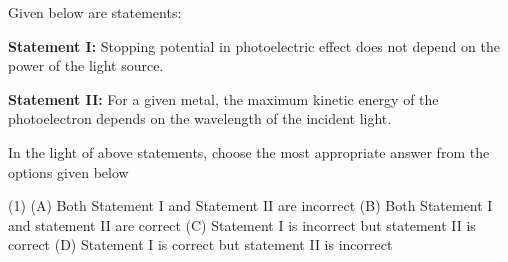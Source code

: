 \item Given below are statements:

\textbf{Statement I:} Stopping potential in photoelectric effect does not depend on the power of the light source.

\textbf{Statement II:} For a given metal, the maximum kinetic energy of the photoelectron depends on the wavelength of the incident light.

In the light of above statements, choose the most appropriate answer from the options given below

\begin{tasks}(1)
    \task (A) Both Statement I and Statement II are incorrect
    \task (B) Both Statement I and statement II are correct
    \task (C) Statement I is incorrect but statement II is correct
    \task (D) Statement I is correct but statement II is incorrect
\end{tasks}